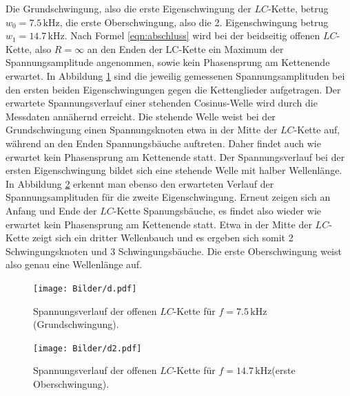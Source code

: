 Die Grundschwingung, also die erste Eigenschwingung der $LC$-Kette, betrug $w_{\mathrm{0}}=7.5 \,\si{\kilo\Hz}$, die erste Oberschwingung, also die 2. Eigenschwingung betrug $w_{\mathrm{1}}=14.7 \,\si{\kilo\Hz}$.
Nach Formel  \eqref{eqn:abschluss} wird bei der beidseitig offenen $LC$-Kette, also $R=\infty$ an den Enden der LC-Kette ein Maximum der Spannungsamplitude angenommen, sowie kein Phasensprung am Kettenende erwartet.
In Abbildung \ref{fig:plotdeins} sind die jeweilig gemessenen Spannungsamplituden bei den ersten beiden Eigenschwingungen gegen die Kettenglieder aufgetragen.
Der erwartete Spannungsverlauf einer stehenden Cosinus-Welle wird durch die Messdaten annähernd erreicht. Die stehende Welle weist bei der Grundschwingung einen Spannungsknoten etwa in der Mitte der $LC$-Kette auf, während an den Enden Spannungsbäuche auftreten.
Daher findet auch wie erwartet kein Phasensprung am Kettenende statt.
 Der Spannungsverlauf bei der ersten Eigenschwingung bildet sich eine stehende Welle mit halber Wellenlänge.
In Abbildung \ref{fig:plotd} erkennt man ebenso den erwarteten Verlauf der Spannungsamplituden für die zweite Eigenschwingung.
Erneut zeigen sich an Anfang und Ende der $LC$-Kette Spanungsbäuche, es findet also wieder wie erwartet kein Phasensprung am Kettenende statt.
Etwa in der Mitte der $LC$-Kette zeigt sich ein dritter Wellenbauch und es ergeben sich somit 2 Schwingungsknoten und 3 Schwingungsbäuche.
Die erste Oberschwingung weist also genau eine Wellenlänge auf.
\begin{figure}
  \centering
 \texttt{[image: Bilder/d.pdf]}
  \caption{Spannungsverlauf der offenen $LC$-Kette für $f=7.5 \,\si{\kilo\Hz}$(Grundschwingung).}
  \label{fig:plotdeins}
\end{figure}

\begin{figure}
  \centering
 \texttt{[image: Bilder/d2.pdf]}
  \caption{Spannungsverlauf der offenen $LC$-Kette für $f=14.7 \,\si{\kilo\Hz}$(erste Oberschwingung).}
  \label{fig:plotd}
\end{figure}
\FloatBarrier
